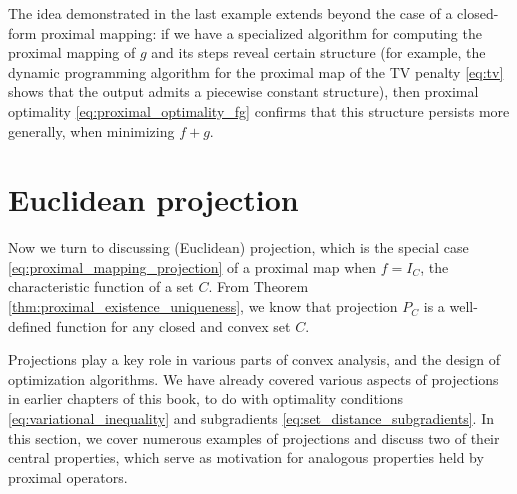 The idea demonstrated in the last example extends beyond the case of a
closed-form proximal mapping: if we have a specialized algorithm for computing
the proximal mapping of $g$ and its steps reveal certain structure (for
example, the dynamic programming algorithm for the proximal map of the TV
penalty \eqref{eq:tv} shows that the output admits a piecewise constant
structure), then proximal optimality \eqref{eq:proximal_optimality_fg} confirms
that this structure persists more generally, when minimizing $f+g$.

\section{Euclidean projection}

Now we turn to discussing (Euclidean) projection, which is the special case
\eqref{eq:proximal_mapping_projection} of a proximal map when $f = I_C$, the
characteristic function of a set $C$. From Theorem
\ref{thm:proximal_existence_uniqueness}, we know that projection $P_C$ is a 
well-defined function for any closed and convex set $C$. 

Projections play a key role in various parts of convex analysis, and the design
of optimization algorithms. We have already covered various aspects of
projections in earlier chapters of this book, to do with optimality conditions 
\eqref{eq:variational_inequality} and subgradients
\eqref{eq:set_distance_subgradients}. In this section, we cover numerous
examples of projections and discuss two of their central properties, which
serve as motivation for analogous properties held by proximal operators.  


